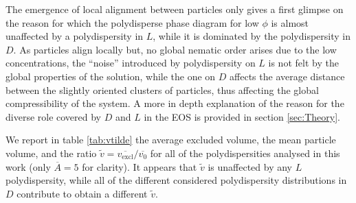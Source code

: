 \documentclass[journal=jacsat,manuscript=article]{achemso}
\begin{document}
The emergence of local alignment between particles  only gives a first glimpse on the reason for which the polydisperse phase diagram for low $\phi$ is almost unaffected by a polydispersity in $L$, while it is dominated by the polydispersity in $D$. As particles align locally but, no global nematic order arises due to the low concentrations, the ``noise'' introduced by polydispersity on $L$ is not felt by the global properties of the solution, while the one on $D$ affects the average distance between the slightly oriented clusters of particles, thus affecting the global compressibility of the system. 
A more in depth explanation of the reason for the diverse role covered by $D$ and $L$ in the EOS is provided in section \ref{sec:Theory}. 


We report in table \ref{tab:vtilde} the average excluded volume, the mean particle volume, and the ratio $\tilde{v}=\overline{v_\mathrm{excl}}/\overline{v_0}$ for all of the polydispersities analysed in this work (only $\overline{A} = 5$ for clarity). It appears that $\tilde{v}$ is unaffected by any $L$ polydispersity, while all of the different considered polydispersity distributions in $D$ contribute to obtain a different $\tilde{v}$.
\end{document}
